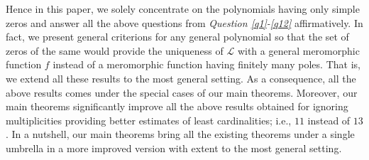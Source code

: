 \documentclass[a4paper,draft]{amsproc}
\theoremstyle{plain}
\newtheorem{defi}{Definition}[section]
\theoremstyle{definition}
\theoremstyle{remark}
\numberwithin{equation}{section}
\begin{document}
Hence in this paper, we  solely concentrate on the polynomials having only simple zeros and answer all the above questions from {\em Question \ref{q1}-\ref{q12}} affirmatively. %
In fact, we present   general criterions for any general polynomial so that the set of zeros of the same would provide the uniqueness of  $\mathcal{L}$ with a general meromorphic function $f$ instead of a meromorphic function having finitely many poles. That is, we extend all these results to the most general setting. As a consequence, all the above results comes under the special cases of our main theorems. %
Moreover, our main theorems significantly improve all the above results obtained for ignoring multiplicities providing better estimates of least cardinalities; i.e., $11$ instead of $13$.   In a nutshell, our main theorems bring all the existing theorems under a single umbrella in a more improved version with extent to the most general setting. 
\end{document}
